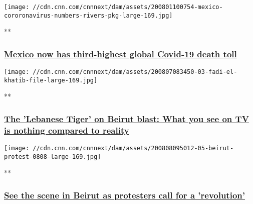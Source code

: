 \href{/videos/world/2020/08/01/mexico-coronavirus-death-toll-rivers-pkg-vpx.cnn/video/playlists/around-the-world/}{}

\texttt{[image: //cdn.cnn.com/cnnnext/dam/assets/200801100754-mexico-cororonavirus-numbers-rivers-pkg-large-169.jpg]}

**

\hypertarget{mexico-now-has-third-highest-global-covid-19-death-toll}{%
\subsubsection{\texorpdfstring{\href{/videos/world/2020/08/01/mexico-coronavirus-death-toll-rivers-pkg-vpx.cnn/video/playlists/around-the-world/}{Mexico
now has third-highest global Covid-19 death
toll}}{Mexico now has third-highest global Covid-19 death toll}}\label{mexico-now-has-third-highest-global-covid-19-death-toll}}

\href{/videos/sports/2020/08/07/fadi-el-khatib-basketball-hero-lebanon-beirut-explosion-charity-spt-intl-lon-orig.cnn/video/playlists/around-the-world/}{}

\texttt{[image: //cdn.cnn.com/cnnnext/dam/assets/200807083450-03-fadi-el-khatib-file-large-169.jpg]}

**

\hypertarget{the-lebanese-tiger-on-beirut-blast-what-you-see-on-tv-is-nothing-compared-to-reality}{%
\subsubsection{\texorpdfstring{\href{/videos/sports/2020/08/07/fadi-el-khatib-basketball-hero-lebanon-beirut-explosion-charity-spt-intl-lon-orig.cnn/video/playlists/around-the-world/}{The
'Lebanese Tiger' on Beirut blast: What you see on TV is nothing compared
to
reality}}{The 'Lebanese Tiger' on Beirut blast: What you see on TV is nothing compared to reality}}\label{the-lebanese-tiger-on-beirut-blast-what-you-see-on-tv-is-nothing-compared-to-reality}}

\href{/videos/world/2020/08/08/protesters-in-beirut-wedeman-vpx.cnn/video/playlists/around-the-world/}{}

\texttt{[image: //cdn.cnn.com/cnnnext/dam/assets/200808095012-05-beirut-protest-0808-large-169.jpg]}

**

\hypertarget{see-the-scene-in-beirut-as-protesters-call-for-a-revolution-}{%
\subsubsection{\texorpdfstring{\href{/videos/world/2020/08/08/protesters-in-beirut-wedeman-vpx.cnn/video/playlists/around-the-world/}{See
the scene in Beirut as protesters call for a 'revolution'
}}{See the scene in Beirut as protesters call for a 'revolution' }}\label{see-the-scene-in-beirut-as-protesters-call-for-a-revolution-}}

